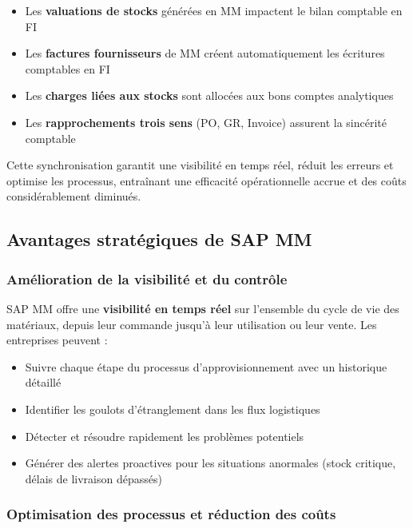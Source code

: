 \documentclass[12pt,a4paper,oneside]{report}
\begin{document}
\begin{itemize}[label=\textbullet, itemsep=0.2em]
	\item Les \textbf{valuations de stocks} générées en MM impactent le bilan comptable en FI
	\item Les \textbf{factures fournisseurs} de MM créent automatiquement les écritures comptables en FI
	\item Les \textbf{charges liées aux stocks} sont allocées aux bons comptes analytiques
	\item Les \textbf{rapprochements trois sens} (PO, GR, Invoice) assurent la sincérité comptable
\end{itemize}

Cette synchronisation garantit une visibilité en temps réel, réduit les erreurs et optimise les processus, 
entraînant une efficacité opérationnelle accrue et des coûts considérablement diminués.

\subsection{Avantages stratégiques de SAP MM}\label{ch2:mm-avantages}

\subsubsection{Amélioration de la visibilité et du contrôle}\label{ch2:mm-visibilite}

SAP MM offre une \textbf{visibilité en temps réel} sur l'ensemble du cycle de vie des matériaux, depuis leur commande 
jusqu'à leur utilisation ou leur vente. Les entreprises peuvent :

\begin{itemize}[label=---, itemsep=0.15em]
	\item Suivre chaque étape du processus d'approvisionnement avec un historique détaillé
	\item Identifier les goulots d'étranglement dans les flux logistiques
	\item Détecter et résoudre rapidement les problèmes potentiels
	\item Générer des alertes proactives pour les situations anormales (stock critique, délais de livraison dépassés)
\end{itemize}

\subsubsection{Optimisation des processus et réduction des coûts}\label{ch2:mm-optim}
\end{document}
